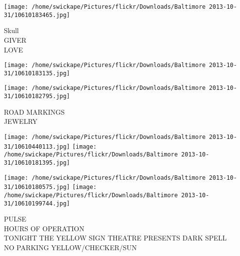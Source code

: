 \documentclass[10pt,letterpaper]{article}
\begin{document}
\texttt{[image: /home/swickape/Pictures/flickr/Downloads/Baltimore 2013-10-31/10610183465.jpg]}

Skull\\
GIVER\\
LOVE
\pagebreak

\texttt{[image: /home/swickape/Pictures/flickr/Downloads/Baltimore 2013-10-31/10610183135.jpg]}

\vspace{0.25in}
\texttt{[image: /home/swickape/Pictures/flickr/Downloads/Baltimore 2013-10-31/10610182795.jpg]}

ROAD MARKINGS\\
JEWELRY
\pagebreak

\texttt{[image: /home/swickape/Pictures/flickr/Downloads/Baltimore 2013-10-31/10610440113.jpg]}
\texttt{[image: /home/swickape/Pictures/flickr/Downloads/Baltimore 2013-10-31/10610181395.jpg]}

\texttt{[image: /home/swickape/Pictures/flickr/Downloads/Baltimore 2013-10-31/10610180575.jpg]}
\texttt{[image: /home/swickape/Pictures/flickr/Downloads/Baltimore 2013-10-31/10610199744.jpg]}

PULSE\\
HOURS OF OPERATION\\
TONIGHT THE YELLOW SIGN THEATRE PRESENTS DARK SPELL\\
NO PARKING YELLOW/CHECKER/SUN
\pagebreak
\end{document}
